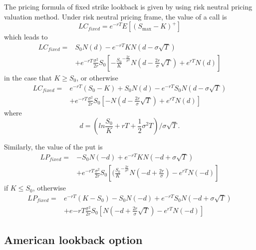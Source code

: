 \documentclass[12pt,oneside,titlepage]{book}
\begin{document}
The pricing formula of fixed strike lookback is given by \cite{Conze1991} using risk neutral pricing valuation method. Under risk neutral pricing frame, the value of a call is 
\begin{equation}
LC_{fixed} = e^{-rT}E[(S_{\max}-K)^{+}]
\end{equation}
which leads to 
\begin{equation}
\begin{split}
LC_{fixed} =& S_0 N(d) - e^{-rT}KN(d-\sigma \sqrt{T}) \\
&+ e^{-rT} \frac{\sigma^2}{2r} S_0 [ -{\frac{S_0}{K}}^{-\frac{2r}{\sigma^2}} N(d-\frac{2r}{\sigma}\sqrt{T}) + e^{rT}N(d)] 
\end{split}
\end{equation}
in the case that $K\geq S_0$, or otherwise
\begin{equation}
\begin{split}
LC_{fixed} = & e^{-rT}(S_0 - K) + S_0 N(d) - e^{-rT}S_0 N(d-\sigma \sqrt{T}) \\
&+ e^{-rT} \frac{\sigma ^2}{2r} S_0 [ -N(d-\frac{2r}{\sigma}\sqrt{T}) + e^{rT}N(d)]
\end{split}
\end{equation}
where
\begin{equation}
d = ( ln\frac{S_0}{K} + rT + \frac{1}{2} \sigma^2 T)/ {\sigma \sqrt{T}}.
\end{equation}

Similarly, the value of the put is 
\begin{equation}
\begin{split}
LP_{fixed} =& -S_0 N(-d) + e^{-rT} KN(-d + \sigma \sqrt{T})  \\
&+ e^{-rT} \frac{\sigma^2}{2r} S_0 [ (\frac{S_0}{K}^{-\frac{2r}{\sigma^2}}N(-d+\frac{2r}{\sigma}) - e^{rT}N(-d)]
\end{split}
\end{equation}
if $K\leq S_0$, otherwise
\begin{equation}
\begin{split}
LP_{fixed} = & e^{-rT} (K-S_0) - S_0 N(-d) + e^{-rT}S_0 N (-d + \sigma \sqrt{T}) \\
&+ e{-rT} \frac{\sigma^2}{2r} S_0 [ N(-d + \frac{2r}{\sigma} \sqrt{T}) -e^{rT}N(-d)]
\end{split}
\end{equation}
 
\subsection{American lookback option}
\end{document}
